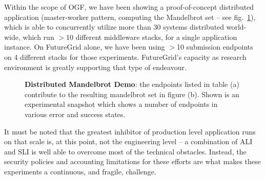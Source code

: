 \documentclass[]{paper}
\begin{document}
 Within the scope of OGF, we have been showing a proof-of-concept
 distributed application (master-worker pattern, computing the
 Mandelbrot set -- see fig.~\ref{fig:mandelbrot}), which is able to
 concurrently utilize more than 30 systems distributed world-wide,
 which run $>$10 different middleware stacks, for a single application
 instance.  On FutureGrid alone, we have been using $>$10 submission
 endpoints on 4 different stacks for those experiments.  FutureGrid's
 capacity as research environment is greatly supporting that type of
 endeavour.

\begin{figure}[ht!]
 \begin{center}
  \vspace*{-1em}
  \caption{\textbf{Distributed Mandelbrot Demo}: the endpoints
   listed in table (a) contribute to the resulting mandelbrot set in
   figure (b).  Shown is an experimental snapshot which shows a number
   of endpoints in various error and success states.}
  \label{fig:mandelbrot}
 \end{center}
\end{figure}

 It must be noted that the greatest inhibitor of production level
 application runs on that scale is, at this point, not the
 engineering level -- a combination of ALI and SLI is well able to
 overcome most of the technical obstacles.  Instead, the security
 policies and accounting limitations for these efforts are what makes
 these experiments a continuous, and fragile, challenge.
\end{document}
